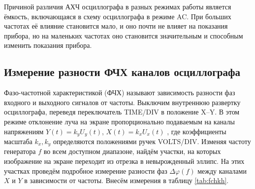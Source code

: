 \documentclass[a4paper,12pt]{article} %
\begin{document}
Причиной различия АХЧ осциллографа в разных режимах работы является ёмкость, включающаяся в схему осциллографа в режиме AC. При больших частотах её влияние становится мало, и оно почти не влияет на показания прибора, но на маленьких частотах оно становится значительным и способным изменить показания прибора.

\subsection{Измерение разности ФЧХ каналов осциллографа}

Фазо-частотной характеристикой (ФЧХ) называют зависимость разности
фаз входного и выходного сигналов от частоты.
Выключим внутреннюю развертку осциллографа, переведя переключатель
TIME/DIV в положение X–Y. В этом режиме отклонение луча на экране
пропорционально подаваемым на каналы напряжениям $ Y\left(t\right)= k_yU_y\left(t\right) $,
$ X\left(t\right) = k_xU_x\left(t\right) $ , где коэффициенты масштаба $ k_x, k_y $ определяются
положениями ручек VOLTS/DIV. Изменяя частоту генератора $ f $ во всем
доступном диапазоне, найдём участки, на которых изображение на экране
переходит из отрезка в невырожденный эллипс. На этих участках проведём
подробное измерение разности фаз $ \Delta \varphi\left(f\right) $ между каналами $ X $ и $ Y $ в
зависимости от частоты. Внесём измерения в таблицу \ref{tab:fchkh}.
\end{document}

